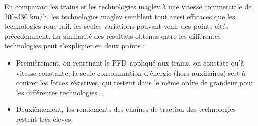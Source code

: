 \documentclass[12pt, a4paper, onecolumn]{article}
\makeatletter
\renewcommand{\tab}{\tabto{15px}}
\newcommand{\csvdel}{}
\newcommand{\bettercite}[1][,]{%
  \renewcommand{\csvdel}{\renewcommand{\csvdel}{}}%
  \csname\endcsname$^[$\checknextarg}
\newcommand{\checknextarg}{\@ifnextchar\bgroup{\gobblenext}{}}%
\newcommand{\gobblenext}[1]{\csvdel\textcolor{blue}{\textbf{\cite{#1}}}\@ifnextchar\bgroup{$^,$\gobblenext}{$^]$}}%
\makeatother
\begin{document}
\pagebreak %
\tab En comparant les trains et les technologies maglev à une vitesse commerciale de 300-330 km/h, les technologies maglev semblent tout aussi efficaces que les technologies roue-rail, les seules variations pouvant venir des points cités précédemment.
La similarité des résultats obtenus entre les différentes technologies peut s’expliquer en deux points :
\begin{itemize}
  \item Premièrement, en reprenant le PFD appliqué aux trains, on constate qu’à vitesse constante, la seule consommation d’énergie (hors auxiliaires) sert à contrer les forces résistives, qui restent dans le même ordre de grandeur pour les différentes technologies\bettercite{ei},
  \item Deuxièmement, les rendements des chaînes de traction des technologies restent très élevés.
\end{itemize}
\end{document}
